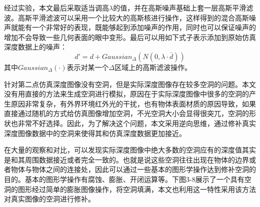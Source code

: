 经过实验，本文最后采取适当调高$\lambda$的值，并在高斯噪声基础上套一层高斯平滑滤波。高斯平滑滤波可以采用一个比较大的高斯核进行操作，这样得到的混合高斯噪声就能有一个非常好的表现，既能够起到添加噪声的作用，同时也可以保证噪声的增加不会导致一些几何表面的眼中变形。最后可以用如下式子表示添加到原始仿真深度数据上的噪声：
\begin{equation}
	d'=d+Gaussian_{\Delta}(N(0, \lambda \cdot \bar{d}))
\end{equation}
其中$Gaussian_{\Delta}(\cdot)$表示对某一个$\Delta$区域上的高斯滤波操作。

针对第二点仿真深度图像没有空洞，但是实际深度图像存在较多空洞的问题。本文没有用直接的方法来生成空洞进行模拟，原因在于实际深度图像中很多的空洞的产生原因非常复杂，有外界环境红外光的干扰，也有物体表面材质的原因导致，如果直接通过随机的方式给仿真图像增加空洞，不光空洞大小会显得很突兀，空洞的形状也非常不好选择。因此，为了解决这个问题，本文采用逆向思维，通过修补真实深度图像数据中的空洞来使得其和仿真深度数据更加接近。

在大量的观察和对比，可以发现实际深度图像中绝大多数的空洞应有的深度值其实是和其周围数据接近或者完全一致的。也就是说这些空洞往往出现在物体的边界或者物体与物体之间的连接处，因此可以通过一些基本的图形学操作达到修补空洞的目的。基本的图形学操作有腐蚀、膨胀、开闭运算等。下图3-8展示了一个具有空洞的图形经过简单的膨胀图像操作，将空洞填满，本文也利用这一特性采用该方法对真实图像的空洞进行修补。

